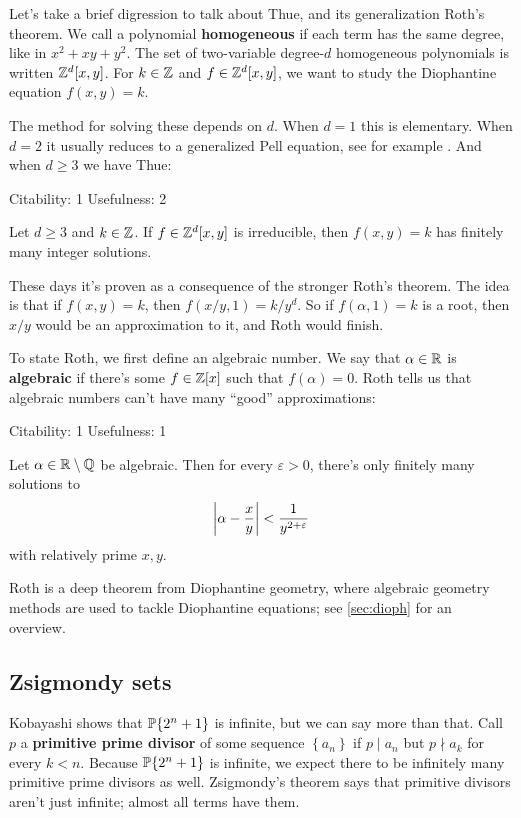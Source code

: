 \documentclass[11pt,paper=letter]{scrartcl}
\newcommand{\seq}[1]{\left\{#1\right\}}
\newcommand{\primeseq}[1]{\PP\!\seq{#1}}
\newcommand{\thmrating}[3]{\begin{center}\sffamily%
\bluebf{#1.} \hfill Citability: #2 \qquad Usefulness: #3%
\vspace{0.3em}\end{center}\noindent\!\!}
\begin{document}
Let's take a brief digression to talk about Thue, and its generalization Roth's theorem. We call a polynomial \textbf{homogeneous} if each term has the same degree, like in $x^2 + xy + y^2$. The set of two-variable degree-$d$ homogeneous polynomials is written $\mathbb Z^d[x, y]$. For $k \in \mathbb Z$ and $f \in \mathbb Z^d[x, y]$, we want to study the Diophantine equation $f(x, y) = k$.

The method for solving these depends on $d$. When $d = 1$ this is elementary. When $d = 2$ it usually reduces to a generalized Pell equation, see for example \cite{djukic07}. And when $d \ge 3$ we have Thue:

\begin{thmboxed*}
\thmrating{Thue's theorem}{1}{2}
Let $d \ge 3$ and $k \in \mathbb Z$. If $f \in \mathbb Z^d[x, y]$ is irreducible, then $f(x, y) = k$ has finitely many integer solutions.
\end{thmboxed*}

These days it's proven as a consequence of the stronger Roth's theorem. The idea is that if $f(x, y) = k$, then $f(x/y, 1) = k/y^d$. So if $f(\alpha, 1) = k$ is a root, then $x/y$ would be an approximation to it, and Roth would finish.

To state Roth, we first define an algebraic number. We say that $\alpha \in \mathbb R$ is \textbf{algebraic} if there's some $f \in \mathbb Z[x]$ such that $f(\alpha) = 0$. Roth tells us that algebraic numbers can't have many ``good'' approximations:

\begin{thmboxed*}
\thmrating{Roth's theorem}{1}{1}
Let $\alpha \in \mathbb R \setminus \mathbb Q$ be algebraic. Then for every $ \varepsilon > 0$, there's only finitely many solutions to $$ \left\lvert \alpha - \frac{x}{y} \right\rvert < \frac{1}{y^{2 + \varepsilon}} $$ with relatively prime $x, y$.
\end{thmboxed*}

Roth is a deep theorem from Diophantine geometry, where algebraic geometry methods are used to tackle Diophantine equations; see \autoref{sec:dioph} for an overview.

\subsection{Zsigmondy sets}

Kobayashi shows that $\primeseq{2^n + 1}$ is infinite, but we can say more than that. Call $p$ a \textbf{primitive prime divisor} of some sequence $\seq{a_n}$ if $p \mid a_n$ but $p \nmid a_k$ for every $k < n$. Because $\primeseq{2^n + 1}$ is infinite, we expect there to be infinitely many primitive prime divisors as well. Zsigmondy's theorem says that primitive divisors aren't just infinite; almost all terms have them.
\end{document}
